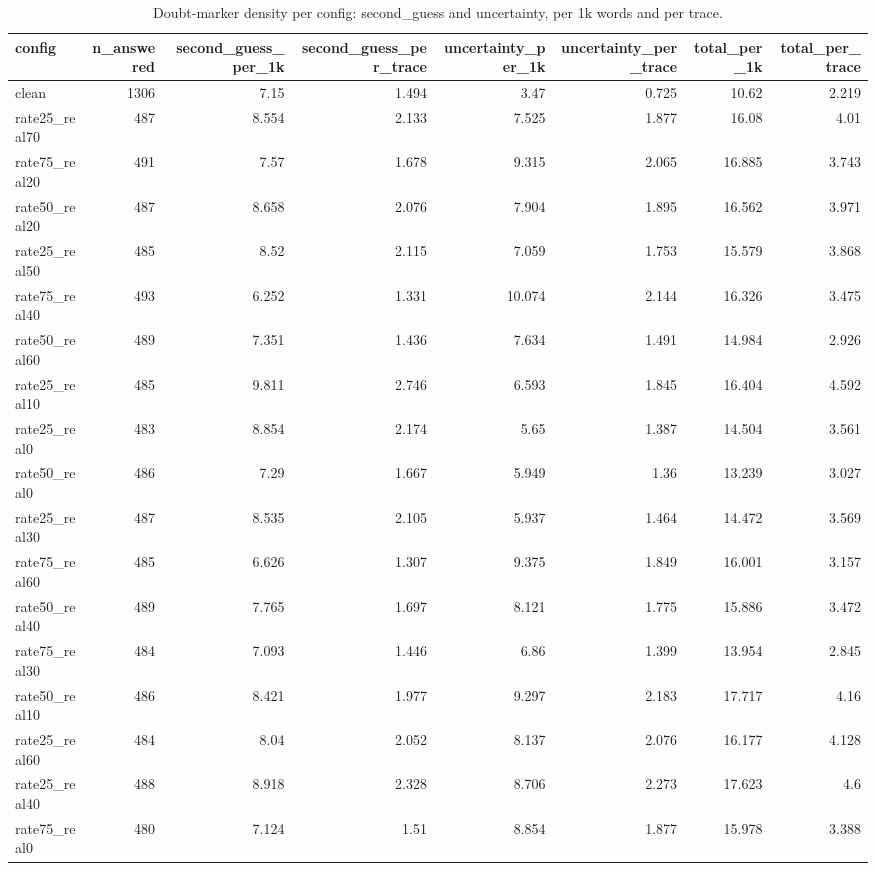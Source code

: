 \documentclass[11pt]{article}
\begin{document}
\begin{table}[H]
\centering
\caption{Doubt-marker density per config: second\_guess and uncertainty, per 1k words and per trace.}
\small
\begin{adjustbox}{max width=\textwidth}
\begin{tabular}{lrrrrrrr}
\toprule
\textbf{config} & \textbf{n\_answered} & \textbf{second\_guess\_per\_1k} & \textbf{second\_guess\_per\_trace} & \textbf{uncertainty\_per\_1k} & \textbf{uncertainty\_per\_trace} & \textbf{total\_per\_1k} & \textbf{total\_per\_trace} \\
\midrule
clean & 1306 & 7.15 & 1.494 & 3.47 & 0.725 & 10.62 & 2.219 \\
rate25\_real70 & 487 & 8.554 & 2.133 & 7.525 & 1.877 & 16.08 & 4.01 \\
rate75\_real20 & 491 & 7.57 & 1.678 & 9.315 & 2.065 & 16.885 & 3.743 \\
rate50\_real20 & 487 & 8.658 & 2.076 & 7.904 & 1.895 & 16.562 & 3.971 \\
rate25\_real50 & 485 & 8.52 & 2.115 & 7.059 & 1.753 & 15.579 & 3.868 \\
rate75\_real40 & 493 & 6.252 & 1.331 & 10.074 & 2.144 & 16.326 & 3.475 \\
rate50\_real60 & 489 & 7.351 & 1.436 & 7.634 & 1.491 & 14.984 & 2.926 \\
rate25\_real10 & 485 & 9.811 & 2.746 & 6.593 & 1.845 & 16.404 & 4.592 \\
rate25\_real0 & 483 & 8.854 & 2.174 & 5.65 & 1.387 & 14.504 & 3.561 \\
rate50\_real0 & 486 & 7.29 & 1.667 & 5.949 & 1.36 & 13.239 & 3.027 \\
rate25\_real30 & 487 & 8.535 & 2.105 & 5.937 & 1.464 & 14.472 & 3.569 \\
rate75\_real60 & 485 & 6.626 & 1.307 & 9.375 & 1.849 & 16.001 & 3.157 \\
rate50\_real40 & 489 & 7.765 & 1.697 & 8.121 & 1.775 & 15.886 & 3.472 \\
rate75\_real30 & 484 & 7.093 & 1.446 & 6.86 & 1.399 & 13.954 & 2.845 \\
rate50\_real10 & 486 & 8.421 & 1.977 & 9.297 & 2.183 & 17.717 & 4.16 \\
rate25\_real60 & 484 & 8.04 & 2.052 & 8.137 & 2.076 & 16.177 & 4.128 \\
rate25\_real40 & 488 & 8.918 & 2.328 & 8.706 & 2.273 & 17.623 & 4.6 \\
rate75\_real0 & 480 & 7.124 & 1.51 & 8.854 & 1.877 & 15.978 & 3.388 \\

\end{tabular}
\end{adjustbox}
\end{table}
\end{document}
